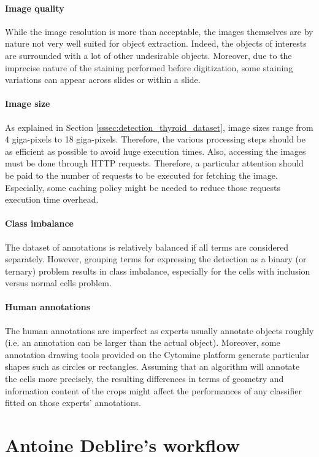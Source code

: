 \paragraph{Image quality} While the image resolution is more than acceptable, the images themselves are by nature not very well suited for object extraction. Indeed, the objects of interests are surrounded with a lot of other undesirable objects. Moreover, due to the imprecise nature of the staining performed before digitization, some staining variations can appear across slides or within a slide. 

\paragraph{Image size} As explained in Section \ref{sssec:detection_thyroid_dataset}, image sizes range from 4 giga-pixels to 18 giga-pixels. Therefore, the various processing steps should be as efficient as possible to avoid huge execution times. Also, accessing the images must be done through HTTP requests. Therefore, a particular attention should be paid to the number of requests to be executed for fetching the image. Especially, some caching policy might be needed to reduce those requests execution time overhead. 

\paragraph{Class imbalance} The dataset of annotations is relatively balanced if all terms are considered separately. However, grouping terms for expressing the detection as a binary (or ternary) problem results in class imbalance, especially for the cells with inclusion versus normal cells problem. 

\paragraph{Human annotations} The human annotations are imperfect as experts usually annotate objects roughly (i.e. an annotation can be larger than the actual object). Moreover, some annotation drawing tools provided on the Cytomine platform generate particular shapes such as circles or rectangles. Assuming that an algorithm will annotate the cells more precisely, the resulting  differences in terms of geometry and information content of the crops might affect the performances of any classifier fitted on those experts' annotations. 

\section{Antoine Deblire's workflow}
\label{sec:thyroid_adeblire_algo}

